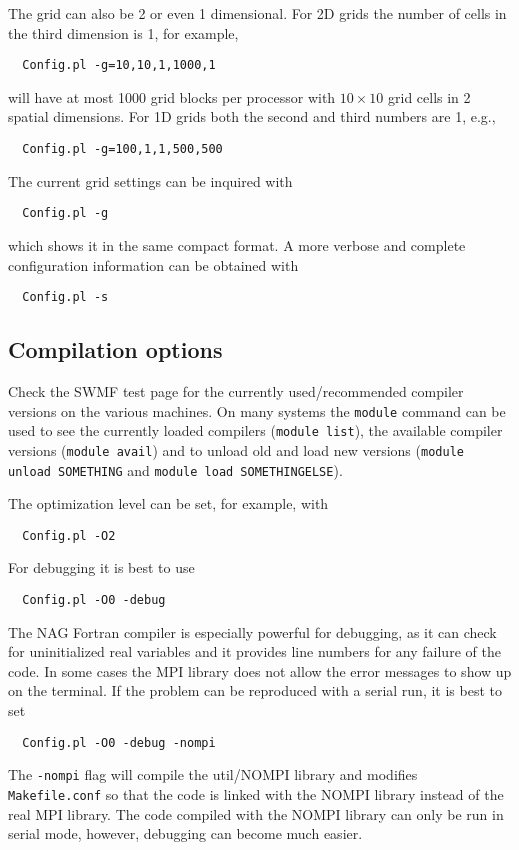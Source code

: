 The grid can also be 2 or even 1 dimensional. For 2D grids the number
of cells in the third dimension is 1, for example,
\begin{verbatim}
  Config.pl -g=10,10,1,1000,1
\end{verbatim}
will have at most 1000 grid blocks per processor with $10\times 10$ grid cells
in 2 spatial dimensions. For 1D grids both the second and third numbers are 1, 
e.g., 
\begin{verbatim}
  Config.pl -g=100,1,1,500,500
\end{verbatim}
The current grid settings can be inquired with
\begin{verbatim}
  Config.pl -g
\end{verbatim}
which shows it in the same compact format. A more verbose and complete
configuration information can be obtained with
\begin{verbatim}
  Config.pl -s
\end{verbatim}

\subsection{Compilation options}

Check the SWMF test page for the currently used/recommended 
compiler versions on the various machines. On many systems the
{\tt module} command can be used to see the currently loaded
compilers ({\tt module list}), the available compiler versions
({\tt module avail}) and to unload old and load new versions
({\tt module unload SOMETHING} and {\tt module load SOMETHINGELSE}).

The optimization level can be set, for example, with
\begin{verbatim}
  Config.pl -O2
\end{verbatim}
For debugging it is best to use
\begin{verbatim}
  Config.pl -O0 -debug
\end{verbatim}
The NAG Fortran compiler is especially powerful for debugging, 
as it can check for uninitialized real variables and it provides 
line numbers for any failure of the code.
In some cases the MPI library does not allow the error messages to show up
on the terminal. If the problem can be reproduced with a serial run, 
it is best to set
\begin{verbatim}
  Config.pl -O0 -debug -nompi
\end{verbatim}
The {\tt -nompi} flag will compile the util/NOMPI library and 
modifies {\tt Makefile.conf} so that the code is linked with
the NOMPI library instead of the real MPI library. 
The code compiled with the NOMPI library can only be
run in serial mode, however, debugging can become much easier.

